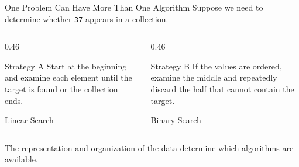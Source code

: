 \documentclass[aspectratio=169,10pt]{beamer}
\begin{document}
\begin{frame}{One Problem Can Have More Than One Algorithm}
  Suppose we need to determine whether \texttt{37} appears in a collection.

  \begin{columns}[T,onlytextwidth]
    \begin{column}{0.46\textwidth}
      \begin{block}{Strategy A}
        Start at the beginning and examine each element until the target is found or the collection ends.
      \end{block}
      \begin{center}
        \Large Linear Search
      \end{center}
    \end{column}
    \begin{column}{0.46\textwidth}
      \begin{block}{Strategy B}
        If the values are ordered, examine the middle and repeatedly discard the half that cannot contain the target.
      \end{block}
      \begin{center}
        \Large Binary Search
      \end{center}
    \end{column}
  \end{columns}

  \begin{keyidea}
    The representation and organization of the data determine which algorithms are available.
  \end{keyidea}
\end{frame}
\end{document}
